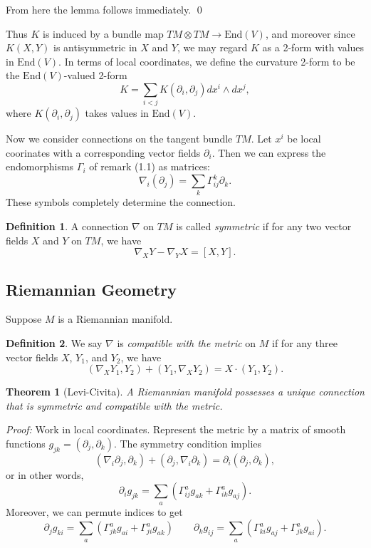 \documentclass[12pt, reqno]{extarticle}
\theoremstyle{plain}
\newtheorem{theorem}{Theorem}[section]
\theoremstyle{definition}
\newtheorem{definition}{Definition}[section]
\theoremstyle{remark}
\begin{document}
From here the lemma follows immediately. \qed

Thus $K$ is induced by a bundle map $TM \otimes TM \to \text{End}(V)$, and moreover since $K(X,Y)$ is 
antisymmetric in $X$ and $Y$, we may regard $K$ as a 2-form with values in $\text{End}(V)$. In terms of local 
coordinates, we define the curvature 2-form to be the $\text{End}(V)$-valued 2-form 
\[
    K = \sum_{i < j}K(\partial_i, \partial_j)dx^i \wedge dx^j,
\]
where $K(\partial_i, \partial_j)$ takes values in $\text{End}(V)$. 

Now we consider connections on the tangent bundle $TM$. Let $x^i$ be local coorinates with a corresponding
vector fields $\partial_i$. Then we can express the endomorphisms $\Gamma_i$ of remark (1.1) 
as matrices: 
\[
    \nabla_i(\partial_j) = \sum_k \Gamma_{ij}^k \partial_k.
\]
These symbols completely determine the connection. 

\begin{definition}
    A connection $\nabla$ on $TM$ is called \textit{symmetric} if for any two vector fields $X$ and $Y$
    on $TM$, we have
    \[
        \nabla_X Y - \nabla_Y X = [X, Y].
    \]
\end{definition}

\subsection{Riemannian Geometry}

Suppose $M$ is a Riemannian manifold.

\begin{definition}
    We say $\nabla$ is \textit{compatible with the metric} on $M$ if for any three vector fields
    $X$, $Y_1$, and $Y_2$, we have
    \[
        (\nabla_X Y_1, Y_2) + (Y_1, \nabla_X Y_2) = X \cdot(Y_1, Y_2).
    \]
\end{definition}

\begin{theorem}[Levi-Civita]
    A Riemannian manifold possesses a unique connection that is symmetric and compatible with the metric.
\end{theorem}

\textit{Proof:} Work in local coordinates. Represent the metric by a matrix of smooth functions
$g_{jk} = (\partial_j, \partial_k)$. The symmetry condition implies 
\[
    (\nabla_i \partial_j, \partial_k) + (\partial_j, \nabla_i\partial_k) = \partial_i(\partial_j,\partial_k),
\]
or in other words,
\[
    \partial_i g_{jk} = \sum_a \left(\Gamma_{ij}^a g_{ak} + \Gamma_{ik}^a g_{aj}\right).
\]
Moreover, we can permute indices to get
\[
    \partial_j g_{ki} = \sum_a \left(\Gamma_{jk}^a g_{ai} + \Gamma_{ji}^a g_{ak}\right)\qquad
    \partial_k g_{ij} = \sum_a \left(\Gamma_{ki}^a g_{aj} + \Gamma_{jk}^a g_{ai}\right).
\]
\end{document}
